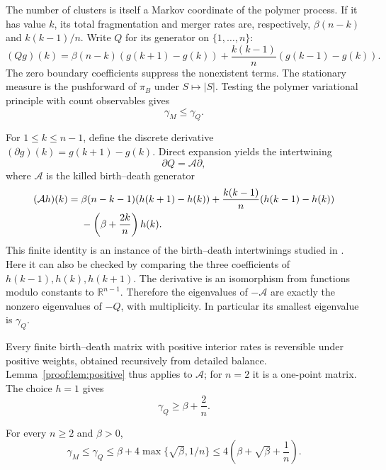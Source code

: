 The number of clusters is itself a Markov coordinate of the polymer
process. If it has value $k$, its total fragmentation and merger rates
are, respectively, $\beta(n-k)$ and $k(k-1)/n$. Write $Q$ for its
generator on $\{1,\ldots,n\}$:
\begin{equation}\label{proof:eq:Q}
 (Qg)(k)=\beta(n-k)(g(k+1)-g(k))
       +\frac{k(k-1)}n(g(k-1)-g(k)).
\end{equation}
The zero boundary coefficients suppress the nonexistent terms. The
stationary measure is the pushforward of $\pi_B$ under $S\mapsto|S|$.
Testing the polymer variational principle with count observables gives
\begin{equation}\label{proof:eq:countupper}
 \gamma_M\leq\gamma_Q.
\end{equation}

For $1\leq k\leq n-1$, define the discrete derivative
$(\partial g)(k)=g(k+1)-g(k)$. Direct expansion yields the intertwining
\begin{equation}\label{proof:eq:gradient}
 \partial Q=\mathcal A\partial,
\end{equation}
where $\mathcal A$ is the killed birth--death generator
\begin{align}
 (\mathcal Ah)(k)
 ={}&\beta(n-k-1)(h(k+1)-h(k))
     +\frac{k(k-1)}n(h(k-1)-h(k))\notag\\
 &-\left(\beta+\frac{2k}n\right)h(k).
 \label{proof:eq:derivativegenerator}
\end{align}
This finite identity is an instance of the birth--death
intertwinings studied in \cite{ChafaiJoulin2013}. Here it can also be
checked by comparing the three coefficients of $h(k-1),h(k),h(k+1)$.
The derivative is an isomorphism from functions modulo constants to
$\mathbb R^{n-1}$. Therefore the eigenvalues of $-\mathcal A$ are
exactly the nonzero eigenvalues of $-Q$, with multiplicity. In
particular its smallest eigenvalue is $\gamma_Q$.

Every finite birth--death matrix with positive interior rates is
reversible under positive weights, obtained recursively from detailed
balance. Lemma~\ref{proof:lem:positive} thus applies to $\mathcal A$;
for $n=2$ it is a one-point matrix. The choice $h=1$ gives
\begin{equation}\label{proof:eq:countbase}
 \gamma_Q\geq\beta+\frac2n.
\end{equation}

\begin{proposition}\label{proof:prop:upper}
For every $n\geq2$ and $\beta>0$,
\begin{equation}\label{proof:eq:uniformupper}
 \gamma_M\leq\gamma_Q
 \leq\beta+4\max\{\sqrt\beta,1/n\}
 \leq4\left(\beta+\sqrt\beta+\frac1n\right).
\end{equation}
\end{proposition}

